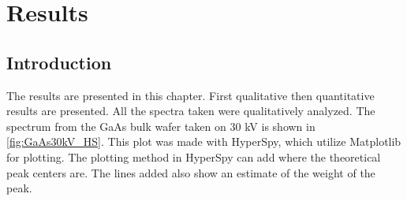 \chapter{Results}
\label{chap:results}




\section{Introduction}
\label{sec:results:intro}
The results are presented in this chapter.
First qualitative then quantitative results are presented.
All the spectra taken were qualitatively analyzed.
The spectrum from the GaAs bulk wafer taken on 30 kV is shown in \cref{fig:GaAs30kV_HS}.
This plot was made with HyperSpy, which utilize Matplotlib for plotting.
The plotting method in HyperSpy can add where the theoretical peak centers are.
The lines added also show an estimate of the weight of the peak.


